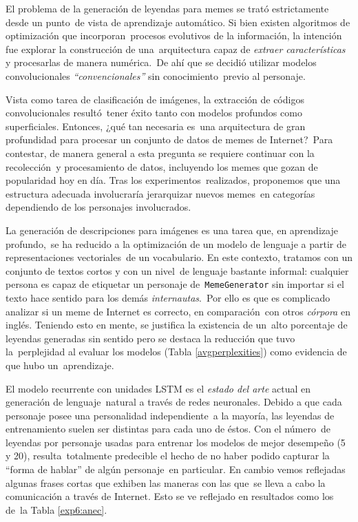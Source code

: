 \noindent
El problema de la generación de leyendas para memes se trató estrictamente desde un punto\
de vista de aprendizaje automático. Si bien existen algoritmos de optimización que incorporan\
procesos evolutivos de la información, la intención fue explorar la construcción de una\
arquitectura capaz de \emph{extraer características} y procesarlas de manera numérica.\
De ahí que se decidió utilizar modelos convolucionales \emph{``convencionales''} sin conocimiento\
previo al personaje.\par
Vista como tarea de clasificación de imágenes, la extracción de códigos convolucionales resultó\
tener éxito tanto con modelos profundos como superficiales. Entonces, ¿qué tan necesaria es\
una arquitectura de gran profundidad para procesar un conjunto de datos de memes de Internet?\
Para contestar, de manera general a esta pregunta se requiere continuar con la recolección\
y procesamiento de datos, incluyendo los memes que gozan de popularidad hoy en día. Tras los experimentos\
realizados, proponemos que una estructura adecuada involucraría jerarquizar nuevos memes\
en categorías dependiendo de los personajes involucrados.\par
La generación de descripciones para imágenes es una tarea que, en aprendizaje profundo,\
se ha reducido a la optimización de un modelo de lenguaje a partir de representaciones vectoriales\
de un vocabulario. En este contexto, tratamos con un conjunto de textos cortos y con un nivel\
de lenguaje bastante informal: cualquier persona es capaz de etiquetar un personaje de\
\verb+MemeGenerator+ sin importar si el texto hace sentido para los demás \emph{internautas}.\
Por ello es que es complicado analizar si un meme de Internet es correcto, en comparación\
con otros \emph{córpora} en inglés. Teniendo esto en mente, se justifica la existencia de un\
alto porcentaje de leyendas generadas sin sentido pero se destaca la reducción que tuvo la\
perplejidad al evaluar los modelos (Tabla \ref{avgperplexities}) como evidencia de que hubo un\
aprendizaje.\par
El modelo recurrente con unidades LSTM es el \emph{estado del arte} actual en generación de lenguaje\
natural a través de redes neuronales. Debido a que cada personaje posee una personalidad independiente\
a la mayoría, las leyendas de entrenamiento suelen ser distintas para cada uno de éstos. Con el número\
de leyendas por personaje usadas para entrenar los modelos de mejor desempeño (5 y 20), resulta\
totalmente predecible el hecho de no haber podido capturar la ``forma de hablar'' de algún personaje\
en particular. En cambio vemos reflejadas algunas frases cortas que exhiben las maneras con las que\
se lleva a cabo la comunicación a través de Internet. Esto se ve reflejado en resultados como los de\
la Tabla \ref{exp6:anec}.

